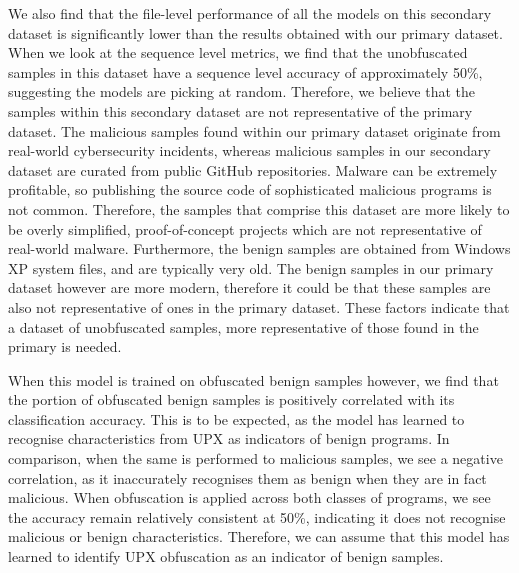 \documentclass[main.tex]{subfiles}
\begin{document}
We also find that the file-level performance of all the models on this secondary dataset is significantly lower than the results obtained with our primary dataset. When we look at the sequence level metrics, we find that the unobfuscated samples in this dataset have a sequence level accuracy of approximately 50\%, suggesting the models are picking at random. Therefore, we believe that the samples within this secondary dataset are not representative of the primary dataset. The malicious samples found within our primary dataset originate from real-world cybersecurity incidents, whereas malicious samples in our secondary dataset are curated from public GitHub repositories. Malware can be extremely profitable, so publishing the source code of sophisticated malicious programs is not common. Therefore, the samples that comprise this dataset are more likely to be overly simplified, proof-of-concept projects which are not representative of real-world malware. Furthermore, the benign samples are obtained from Windows XP system files, and are typically very old. The benign samples in our primary dataset however are more modern, therefore it could be that these samples are also not representative of ones in the primary dataset. These factors indicate that a dataset of unobfuscated samples, more representative of those found in the primary is needed. 

When this model is trained on obfuscated benign samples however, we find that the portion of obfuscated benign samples is positively correlated with its classification accuracy. This is to be expected, as the model has learned to recognise characteristics from UPX as indicators of benign programs. In comparison, when the same is performed to malicious samples, we see a negative correlation, as it inaccurately recognises them as benign when they are in fact malicious. When obfuscation is applied across both classes of programs, we see the accuracy remain relatively consistent at 50\%, indicating it does not recognise malicious or benign characteristics. Therefore, we can assume that this model has learned to identify UPX obfuscation as an indicator of benign samples. 
\end{document}
